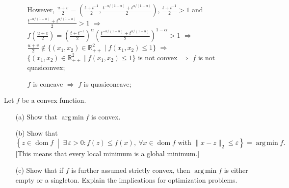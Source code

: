 \documentclass[11pt,letter,notitlepage]{article}
\theoremstyle{definition}
\begin{document}
\begin{solution}
\begin{enumerate}
\begin{enumerate}
            However, $\frac{u+v}{2} = \left(\frac{t+t^{-1}}{2}, \frac{t^{-\alpha/(1-\alpha)} + t^{\alpha/(1-\alpha)}}{2}\right)$, $\frac{t+t^{-1}}{2} > 1$ and $\frac{t^{-\alpha/(1-\alpha)} + t^{\alpha/(1-\alpha)}}{2} > 1$ $\Longrightarrow$ $f\left(\frac{u+v}{2}\right) = \left(\frac{t+t^{-1}}{2}\right)^\alpha \left(\frac{t^{-\alpha/(1-\alpha)} + t^{\alpha/(1-\alpha)}}{2}\right)^{1-\alpha} > 1$ $\Longrightarrow$ $\frac{u+v}{2} \not\in \{(x_1,x_2) \in \mathbb{R}_{++}^2 \mid f(x_1,x_2) \le 1\}$ $\Longrightarrow$ $\{(x_1,x_2) \in \mathbb{R}_{++}^2 \mid f(x_1,x_2) \le 1\}$ is not convex $\Longrightarrow$ $f$ is not quasiconvex;
            \item[\ding{174}] $f$ is concave $\Longrightarrow$ $f$ is quasiconcave;
        \end{enumerate}
    \end{enumerate}
\end{solution}

\newpage
\begin{exercise}[ ]
	Let $f$ be a convex function.

\begin{enumerate}
    \item[(a)] Show that $\operatorname*{arg\,min} f$ is convex.
    
    \item[(b)] Show that
    \[
    \left\{
    z \in \operatorname{dom} f \;\middle|\;
    \exists \,\varepsilon > 0 : f(z) \le f(x),\ \forall x \in \operatorname{dom} f
    \text{ with } \|x-z\|_2 \le \varepsilon
    \right\}
    = \operatorname*{arg\,min} f.
    \]
    [This means that every local minimum is a global minimum.]
    
    \item[(c)] Show that if $f$ is further assumed strictly convex, then $\operatorname*{arg\,min} f$ is either empty or a singleton. Explain the implications for optimization problems.
\end{enumerate}
\end{exercise}
\end{document}

